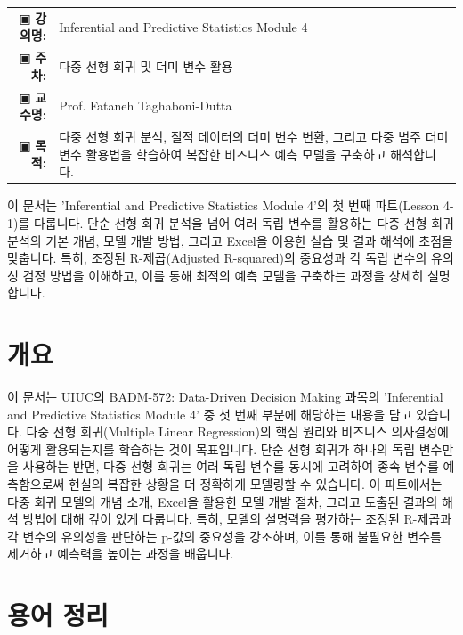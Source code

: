 \documentclass[11pt,a4paper]{article}
\makeatletter
\theoremstyle{definition}
\newcommand{\metainfo}[4]{
\begin{tcolorbox}[
    colback=lightpurple,
    colframe=darkpurple,
    boxrule=1pt,
    arc=2mm,
    left=10pt,
    right=10pt,
    top=8pt,
    bottom=8pt
]
\begin{tabular}{@{}rl@{}}
▣ \textbf{강의명:} & #1 \\[0.3em]
▣ \textbf{주차:} & #2 \\[0.3em]
▣ \textbf{교수명:} & #3 \\[0.3em]
▣ \textbf{목적:} & \begin{minipage}[t]{0.75\textwidth}#4\end{minipage}
\end{tabular}
\end{tcolorbox}
}
\makeatother
\begin{document}
\thispagestyle{firstpage}

\metainfo{Inferential and Predictive Statistics Module 4}{다중 선형 회귀 및 더미 변수 활용}{Prof. Fataneh Taghaboni-Dutta}{다중 선형 회귀 분석, 질적 데이터의 더미 변수 변환, 그리고 다중 범주 더미 변수 활용법을 학습하여 복잡한 비즈니스 예측 모델을 구축하고 해석합니다.}

\tableofcontents

\newpage

\begin{summarybox}
이 문서는 'Inferential and Predictive Statistics Module 4'의 첫 번째 파트(Lesson 4-1)를 다룹니다.
단순 선형 회귀 분석을 넘어 여러 독립 변수를 활용하는 다중 선형 회귀 분석의 기본 개념, 모델 개발 방법, 그리고 Excel을 이용한 실습 및 결과 해석에 초점을 맞춥니다.
특히, 조정된 R-제곱(Adjusted R-squared)의 중요성과 각 독립 변수의 유의성 검정 방법을 이해하고, 이를 통해 최적의 예측 모델을 구축하는 과정을 상세히 설명합니다.
\end{summarybox}

\newpage
\section{개요}
이 문서는 UIUC의 BADM-572: Data-Driven Decision Making 과목의 'Inferential and Predictive Statistics Module 4' 중 첫 번째 부분에 해당하는 내용을 담고 있습니다.
다중 선형 회귀(Multiple Linear Regression)의 핵심 원리와 비즈니스 의사결정에 어떻게 활용되는지를 학습하는 것이 목표입니다.
단순 선형 회귀가 하나의 독립 변수만을 사용하는 반면, 다중 선형 회귀는 여러 독립 변수를 동시에 고려하여 종속 변수를 예측함으로써 현실의 복잡한 상황을 더 정확하게 모델링할 수 있습니다.
이 파트에서는 다중 회귀 모델의 개념 소개, Excel을 활용한 모델 개발 절차, 그리고 도출된 결과의 해석 방법에 대해 깊이 있게 다룹니다.
특히, 모델의 설명력을 평가하는 조정된 R-제곱과 각 변수의 유의성을 판단하는 p-값의 중요성을 강조하며, 이를 통해 불필요한 변수를 제거하고 예측력을 높이는 과정을 배웁니다.

\newpage
\section{용어 정리}
\end{document}
